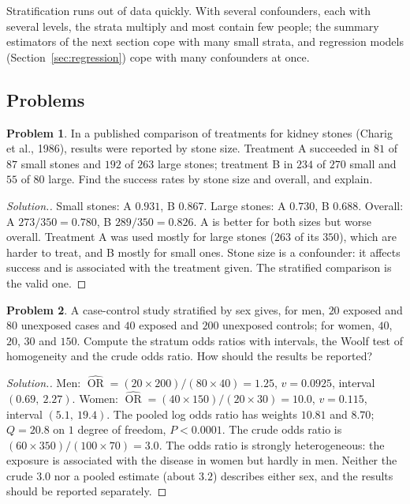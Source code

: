 \documentclass[11pt,a4paper]{article}
\numberwithin{equation}{section}
\DeclareMathOperator{\OR}{OR}
\theoremstyle{definition}
\newtheorem{problemx}{Problem}[subsection]
\newenvironment{problem}{\begin{problemx}}{\end{problemx}}
\newenvironment{solution}
  {\renewcommand{\qedsymbol}{}\begin{proof}[\textit{Solution}.]}
  {\end{proof}}
\begin{document}
Stratification runs out of data quickly. With several confounders, each with several levels, the strata multiply and most contain few
people; the summary estimators of the next section cope with many small strata, and regression models (Section~\ref{sec:regression})
cope with many confounders at once.

\subsection{Problems}

\begin{problem}
\label{prob:simpson}
In a published comparison of treatments for kidney stones (Charig et al., 1986), results were reported by stone size. Treatment A succeeded in $81$ of $87$ small stones and $192$ of $263$ large stones;
treatment B in $234$ of $270$ small and $55$ of $80$ large. Find the success rates by stone size and overall, and explain.
\end{problem}

\begin{solution}
Small stones: A $0.931$, B $0.867$. Large stones: A $0.730$, B $0.688$. Overall: A $273/350 = 0.780$, B $289/350 = 0.826$. A is better for both sizes but worse
overall. Treatment A was used mostly for large stones ($263$ of its $350$), which are harder to treat, and B mostly for small ones. Stone
size is a confounder: it affects success and is associated with the treatment given. The stratified comparison is the valid one.
\end{solution}

\begin{problem}
A case-control study stratified by sex gives, for men, $20$ exposed and $80$ unexposed cases and $40$ exposed and $200$ unexposed controls;
for women, $40$, $20$, $30$ and $150$. Compute the stratum odds ratios with intervals, the Woolf test of homogeneity and the crude odds ratio.
How should the results be reported?
\end{problem}

\begin{solution}
Men: $\widehat{\OR} = (20 \times 200)/(80 \times 40) = 1.25$, $v = 0.0925$, interval $(0.69,\ 2.27)$. Women: $\widehat{\OR} = (40 \times 150)/(20 \times 30) = 10.0$, $v = 0.115$, interval
$(5.1,\ 19.4)$. The pooled log odds ratio has weights $10.81$ and $8.70$; $Q = 20.8$ on $1$ degree of freedom, $P < 0.0001$. The crude odds ratio is
$(60 \times 350)/(100 \times 70) = 3.0$. The odds ratio is strongly heterogeneous: the exposure is associated with the disease in women but hardly in
men. Neither the crude $3.0$ nor a pooled estimate (about $3.2$) describes either sex, and the results should be reported separately.
\end{solution}
\end{document}
